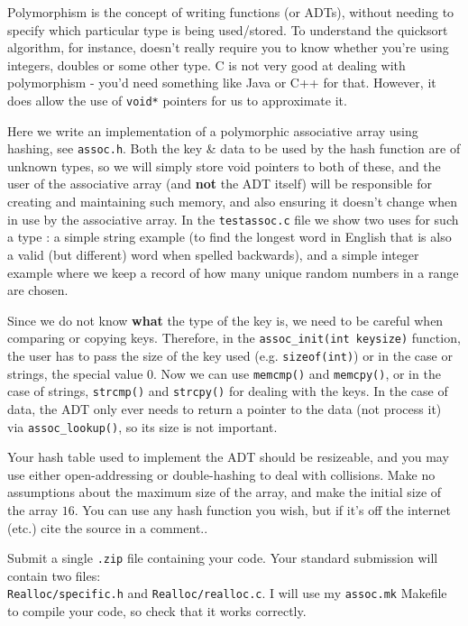 
Polymorphism is the concept of writing functions (or ADTs), without
needing to specify which particular type is being used/stored. To
understand the quicksort algorithm, for instance, doesn't really require
you to know whether you're using integers, doubles or some other type. C
is not very good at dealing with polymorphism - you'd need something
like Java or C++ for that. However, it does allow the use of
\verb^void*^ pointers for us to approximate it.

\begin{exercise}
\label{ex:hahspoly}
Here we write an implementation of a polymorphic associative array using
hashing, see \verb^assoc.h^. Both the key \& data to be used by the hash
function are of
unknown types, so we will simply store void pointers to
both of these, and the user of the associative array (and {\bf not} the
ADT itself) will be responsible for creating and maintaining such memory,
and also ensuring it doesn't change when in use by the associative array.
In the \verb^testassoc.c^ file we show two uses for such a type :
a simple string example (to find the longest word in English that is
also a valid (but different) word when spelled backwards), and a simple
integer example where we keep a record of how many unique random numbers
in a range are chosen.

Since we do not know {\bf what} the type of the key is, we
need to be careful when comparing or copying keys. Therefore, in the
\verb^assoc_init(int keysize)^ function, the user has to pass the size of the
key used (e.g. \verb^sizeof(int)^) or in the case or strings, the special value $0$.
Now we can use \verb^memcmp()^ and \verb^memcpy()^, or in the case of strings, \verb^strcmp()^
and \verb^strcpy()^ for dealing with the keys. In the case of data, the ADT only ever needs
to return a pointer to the data (not process it) via
\verb^assoc_lookup()^, so its size is not important.

Your hash table used to implement the ADT should be resizeable, and you may use either
open-addressing or double-hashing to deal with collisions. Make no assumptions about
the maximum size of the array, and make the initial size of the array $16$.
You can use any hash function you wish, but if it's off the internet (etc.) cite
the source in a comment..

Submit a single \verb^.zip^ file containing your code.
Your standard submission will contain two files:\\
\verb^Realloc/specific.h^ and \verb^Realloc/realloc.c^.
I will use my \verb^assoc.mk^ Makefile to compile your code,
so check that it works correctly.
\end{exercise}

